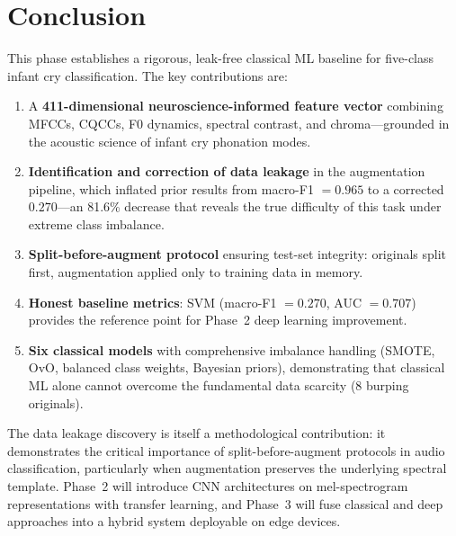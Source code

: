\documentclass[11pt,a4paper]{article}
\begin{document}
\section{Conclusion}
\label{sec:conclusion}

This phase establishes a rigorous, leak-free classical ML baseline for
five-class infant cry classification. The key contributions are:

\begin{enumerate}[nosep]
  \item A \textbf{411-dimensional neuroscience-informed feature vector}
        combining MFCCs, CQCCs, F0 dynamics, spectral contrast, and
        chroma---grounded in the acoustic science of infant cry
        phonation modes.
  \item \textbf{Identification and correction of data leakage} in the
        augmentation pipeline, which inflated prior results from
        macro-F1 $= 0.965$ to a corrected $0.270$---an 81.6\% decrease
        that reveals the true difficulty of this task under extreme
        class imbalance.
  \item \textbf{Split-before-augment protocol} ensuring test-set
        integrity: originals split first, augmentation applied only to
        training data in memory.
  \item \textbf{Honest baseline metrics}: SVM (macro-F1 $= 0.270$,
        AUC $= 0.707$) provides the reference point for Phase~2
        deep learning improvement.
  \item \textbf{Six classical models} with comprehensive imbalance
        handling (SMOTE, OvO, balanced class weights, Bayesian priors),
        demonstrating that classical ML alone cannot overcome the
        fundamental data scarcity (8 burping originals).
\end{enumerate}

\noindent
The data leakage discovery is itself a methodological contribution:
it demonstrates the critical importance of split-before-augment
protocols in audio classification, particularly when augmentation
preserves the underlying spectral template. Phase~2 will introduce
CNN architectures on mel-spectrogram representations with transfer
learning, and Phase~3 will fuse classical and deep approaches into a
hybrid system deployable on edge devices.
\end{document}

